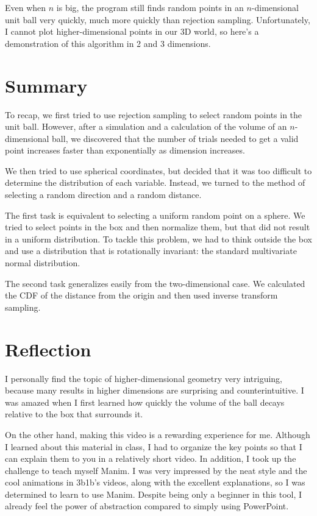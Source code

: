 \documentclass{article}
\begin{document}
Even when $n$ is big, the program still finds random points in an $n$-dimensional unit ball very quickly, much more quickly than rejection sampling. Unfortunately, I cannot plot higher-dimensional points in our 3D world, so here's a demonstration of this algorithm in 2 and 3 dimensions.


\section{Summary}

To recap, we first tried to use rejection sampling to select random points in the unit ball. However, after a simulation and a calculation of the volume of an $n$-dimensional ball, we discovered that the number of trials needed to get a valid point increases faster than exponentially as dimension increases.

We then tried to use spherical coordinates, but decided that it was too difficult to determine the distribution of each variable. Instead, we turned to the method of selecting a random direction and a random distance.

The first task is equivalent to selecting a uniform random point on a sphere. We tried to select points in the box and then normalize them, but that did not result in a uniform distribution. To tackle this problem, we had to think outside the box and use a distribution that is rotationally invariant: the standard multivariate normal distribution.

The second task generalizes easily from the two-dimensional case. We calculated the CDF of the distance from the origin and then used inverse transform sampling.

\section{Reflection}

I personally find the topic of higher-dimensional geometry very intriguing, because many results in higher dimensions are surprising and counterintuitive. I was amazed when I first learned how quickly the volume of the ball decays relative to the box that surrounds it.


On the other hand, making this video is a rewarding experience for me. Although I learned about this material in class, I had to organize the key points so that I can explain them to you in a relatively short video. In addition, I took up the challenge to teach myself Manim. I was very impressed by the neat style and the cool animations in 3b1b's videos, along with the excellent explanations, so I was determined to learn to use Manim. Despite being only a beginner in this tool, I already feel the power of abstraction compared to simply using PowerPoint.
\end{document}
